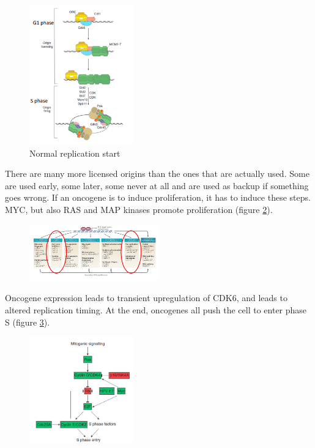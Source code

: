 \begin{figure}[H]
\centering
\includegraphics[width=0.4\textwidth]{../_resources/cf33180a017e8d51c049566410ac8b20.png}
\caption{Normal replication start}
\label{fig:rep}
\end{figure}

There are many more licensed origins than the ones that are actually
used. Some are used early, some later, some never at all and are used as
backup if something goes wrong.
If an oncogene is to induce proliferation, it has to induce these steps.
MYC, but also RAS and MAP kinases promote proliferation (figure \ref{fig:origins}).

\begin{figure}[H]
\centering
\includegraphics[width=0.5\textwidth]{../_resources/a78ad57bf8373a5417b0ddce30b8ed72.png}
\label{fig:origins}
\end{figure}

Oncogene expression leads to transient upregulation of CDK6, and leads to altered replication timing. At the end, oncogenes all push the cell to enter phase S (figure \ref{fig:sphase}).

\begin{figure}[H]
\centering
\includegraphics[width=0.4\textwidth]{../_resources/32b183547f544448275d6f43d7693d7e.png} 
\label{fig:sphase}
\end{figure}

